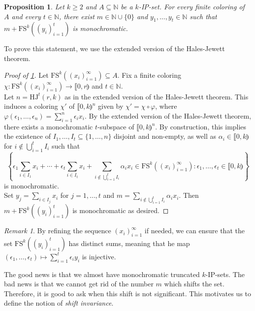 \documentclass{article}
\theoremstyle{definition}
\theoremstyle{plain}
\newtheorem{proposition}[theorem]{Proposition}
\theoremstyle{remark}
\newtheorem{remark}{Remark}[section]
\newcommand{\N}{\ensuremath{\mathbb{N}}}
\renewcommand{\phi}{\varphi}
\newcommand{\HJ}{\ensuremath{\mathrm{HJ}}}
\newcommand{\FS}[2][]{\ensuremath{\mathrm{FS}^{#1}\left(#2\right)}}
\newcommand{\seq}[2]{\ensuremath{\left ( {#1}_{#2}\right )_{#2 = 1}^\infty }}
\begin{document}
    \begin{proposition}\label{shift IPk0}
        Let $k\geq 2$ and $A\subseteq \N$ be a $k$-IP-set. For every finite coloring of $A$ and every $t\in \N$, there exist $m \in \N \cup \{0\}$ and $y_1,\ldots, y_t \in \N$ such that $m + \FS[k]{(y_i)_{i=1}^t}$ is monochromatic.
    \end{proposition}
    To prove this statement, we use the extended version of the Hales-Jewett theorem. 
    \begin{proof}[Proof of \cref{shift IPk0}]
        Let $\FS[k]{\seq{x}{i}} \subseteq A$. Fix a finite coloring $\chi: \FS[k]{\seq{x}{i}} \to \llbracket 0,r \rrparenthesis$ and $t \in \N$.\\
        
        Let $n = \HJ^t(r,k)$ as in the extended version of the Hales-Jewett theorem. This induces a coloring $\chi'$ of $\llbracket 0,k \rrparenthesis^n$ given by $\chi' = \chi \circ \phi$, where $\phi(\epsilon_1, \ldots, \epsilon_n) = \sum_{i=1}^n \epsilon_i x_i$. By the extended version of the Hales-Jewett theorem, there exists a monochromatic $t$-subspace of $\llbracket 0,k \rrparenthesis^n$. By construction, this implies the existence of $I_1,\ldots,I_t \subseteq \{1,\ldots,n\}$ disjoint and non-empty, as well as $\alpha_i \in \llbracket 0,k \rrparenthesis$ for $i\notin \bigcup_{i=1}^t I_i$ such that
        $$\left \{ \epsilon_1 \sum_{i \in I_1} x_i + \cdots + \epsilon_t \sum_{i \in I_t} x_i + \sum_{i \notin \bigcup_{i=1}^t I_i} \alpha_i x_i \in \FS[k]{\seq{x}{i}}: \epsilon_1,\ldots,\epsilon_t \in \llbracket 0,k \rrparenthesis \right \}$$
        is monochromatic.\\

        Set $y_j= \sum_{i \in I_j} x_i$ for $j=1,\ldots,t$ and $m = \sum_{i \notin \bigcup_{i=1}^t I_i} \alpha_i x_i$. Then $m + \FS[k]{(y_i)_{i=1}^t}$ is monochromatic as desired.
    \end{proof}
    \begin{remark}\label{remark_good_sum}
        By refining the sequence $\seq{x}{i}$ if needed, we can ensure that the set $\FS[k]{(y_i)_{i=1}^t}$ has distinct sums, meaning that he map $(\epsilon_1,\ldots,\epsilon_t) \mapsto \sum_{i=1}^t \epsilon_i y_i$ is injective.
    \end{remark}

    The good news is that we almost have monochromatic truncated $k$-IP-sets. The bad news is that we cannot get rid of the number $m$ which shifts the set. Therefore, it is good to ask when this shift is not significant. This motivates us to define the notion of \emph{shift invariance}.
 
\end{document}
